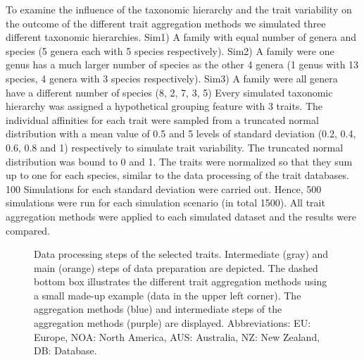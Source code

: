 \documentclass{article}
\begin{document}
To examine the influence of the taxonomic hierarchy and the trait variability on the outcome of the different trait aggregation methods we simulated three different taxonomic hierarchies. 
Sim1) A family with equal number of genera and species (5 genera each with 5 species respectively).
Sim2) A family were one genus has a much larger number of species as the other 4 genera (1 genus with 13 species, 4 genera with 3 species respectively). 
Sim3) A family were all genera have a different number of species (8, 2, 7, 3, 5)
Every simulated taxonomic hierarchy was assigned a hypothetical grouping feature with 3 traits. The individual affinities for each trait were sampled from a truncated normal distribution with a mean value of 0.5 and 5 levels of standard deviation (0.2, 0.4, 0.6, 0.8 and 1) respectively to simulate trait variability. The truncated normal distribution was bound to 0 and 1. The traits were normalized so that they sum up to one for each species, similar to the data processing of the trait databases. 100 Simulations for each standard deviation were carried out. Hence, 
500 simulations were run for each simulation scenario (in total 1500). 
All trait aggregation methods were applied to each simulated dataset and the results were compared.   


\begin{figure}
  \centering
  
  \caption{Data processing steps of the selected traits. Intermediate (gray) and main (orange) steps of data preparation are depicted. The dashed bottom box illustrates the different trait aggregation methods using a small made-up example (data in the upper left corner). The aggregation methods (blue) and intermediate steps of the aggregation methods (purple) are displayed. Abbreviations: EU: Europe, NOA: North America, AUS: Australia, NZ: New Zealand, DB: Database.}
\end{figure}

\end{document}
